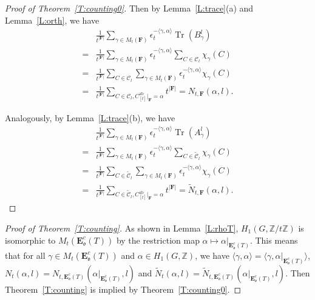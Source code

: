 \documentclass[11pt]{amsart}
\theoremstyle{plain}
\theoremstyle{definition}
\newcommand{\mbbZ}{{\mathbb Z}}
\newcommand{\mcalC}{{\mathcal C}}
\newcommand{\mfrako}{{\mathfrak o}}
\newcommand{\vE}{{\mathbf E}}
\newcommand{\vF}{{\mathbf F}}
\DeclareMathOperator{\ab}{\operatorname{ab}}
\DeclareMathOperator{\trace}{\operatorname{Tr}}
\numberwithin{equation}{section}
\begin{document}
\begin{proof}[Proof of Theorem~\ref{T:counting0}]
Then by Lemma~\ref{L:trace}(a) and Lemma~\ref{L:orth}, we have
\begin{align*}
& \frac{1}{t^{|\vF|}}\sum_{\gamma\in M_t(\vF)}\epsilon_t^{-\langle\gamma, \alpha\rangle}\trace\left(B_\gamma^l\right) \\
=& \frac{1}{t^{|\vF|}}\sum_{\gamma\in M_t(\vF)}\epsilon_t^{-\langle\gamma, \alpha\rangle}\sum_{C\in \mcalC_l}\chi_\gamma(C) \\
=& \frac{1}{t^{|\vF|}}\sum_{C\in \mcalC_l} \sum_{\gamma\in M_t(\vF)}\epsilon_t^{-\langle\gamma, \alpha\rangle}\chi_\gamma(C)  \\
=& \frac{1}{t^{|\vF|}}\sum_{C\in \mcalC_l, C^{\ab}_{[t]}|_{\vF}=\alpha}   t^{|\vF|} = N_{t,\vF}(\alpha,l).
\end{align*}

Analogously, by Lemma~\ref{L:trace}(b), we have
\begin{align*}
 & \frac{1}{t^{|\vF|}}\sum_{\gamma\in M_t(\vF)}\epsilon_t^{-\langle\gamma, \alpha\rangle}\trace\left(A_\gamma^l\right) \\
=& \frac{1}{t^{|\vF|}}\sum_{\gamma\in M_t(\vF)}\epsilon_t^{-\langle\gamma, \alpha\rangle}\sum_{C\in \widetilde{\mcalC}_l}\chi_\gamma(C) \\
=& \frac{1}{t^{|\vF|}}\sum_{C\in \widetilde{\mcalC}_l} \sum_{\gamma\in M_t(\vF)}\epsilon_t^{-\langle\gamma, \alpha\rangle}\chi_\gamma(C)  \\
=&  \frac{1}{t^{|\vF|}}\sum_{C\in \widetilde{\mcalC}_l, C^{\ab}_{[t]}|_{\vF}=\alpha}  t^{|\vF|} = \widetilde{N}_{t,\vF}(\alpha,l).
\end{align*}

\end{proof}

\begin{proof}[Proof of Theorem~\ref{T:counting}]
As shown in Lemma~\ref{L:rhoT}, $H_1(G,\mbbZ/t\mbbZ)$ is isomorphic to $M_t(\vE_\mfrako^c(T))$ by the restriction map $\alpha \mapsto \alpha|_{\vE_\mfrako^c(T)}$. This means that for all  $\gamma\in M_t(\vE_\mfrako^c(T))$ and $\alpha \in H_1(G,\mbbZ)$, we have $ \langle\gamma, \alpha\rangle = \langle\gamma, \alpha|_{\vE_\mfrako^c(T)}\rangle$, 
$N_t(\alpha,l)  = N_{t,\vE_\mfrako^c(T)}(\alpha|_{\vE_\mfrako^c(T)},l) $ and $ \widetilde{N}_t(\alpha,l)  =  \widetilde{N}_{t,\vE_\mfrako^c(T)}(\alpha|_{\vE_\mfrako^c(T)},l)$. 
Then Theorem~\ref{T:counting} is implied by Theorem~\ref{T:counting0}. 
\end{proof}
\end{document}
